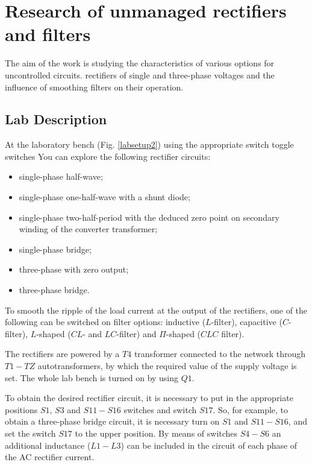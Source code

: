\documentclass[a4paper,14pt]{article}
\begin{document}
\section{Research of unmanaged rectifiers and filters}

The aim of the work is studying the characteristics of various options for uncontrolled circuits.
rectifiers of single and three-phase voltages and the influence of smoothing filters on their operation.

\subsection{Lab Description}

At the laboratory bench (Fig. \ref{labsetup2}) using the appropriate switch toggle switches
You can explore the following rectifier circuits:

\begin{itemize}
	\item single-phase half-wave;
	\item single-phase one-half-wave with a shunt diode;
	\item single-phase two-half-period with the deduced zero point on secondary winding 
		of the converter transformer;
\item single-phase bridge;
\item three-phase with zero output;
\item three-phase bridge.
\end{itemize}

To smooth the ripple of the load current at the output of the rectifiers, one of the following 
can be switched on filter options: inductive ($L$-filter), capacitive ($C$-filter), $L$-shaped ($CL$- and $LC$-filter) 
and $\Pi$-shaped ($CLC$ filter).

The rectifiers are powered by a $T4$ transformer connected to the network through $T1-TZ$ autotransformers,
by which the required value of the supply voltage is set. The whole lab bench is turned on by using $Q1$.

To obtain the desired rectifier circuit, it is necessary to put in the appropriate positions
$S1$, $S3$ and $S11-S16$ switches and switch $S17$. So, for example, to obtain a three-phase bridge circuit, 
it is necessary turn on $S1$ and $S11-S16$, and set the switch $S17$ to the upper position. 
By means of switches $S4-S6$ an additional inductance ($L1-L3$) can be included in the circuit of each phase 
of the AC rectifier current.
\end{document}
